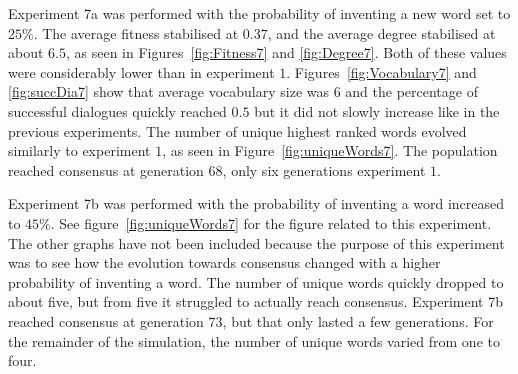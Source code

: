 Experiment 7a was performed with the probability of inventing a new word set to $25\%$. The average fitness stabilised at $0.37$, and the average degree stabilised at about $6.5$, as seen in Figures~\ref{fig:Fitness7} and \ref{fig:Degree7}. Both of these values were considerably lower than in experiment $1$. Figures~\ref{fig:Vocabulary7} and \ref{fig:succDia7} show that average vocabulary size was $6$ and the percentage of successful dialogues quickly reached $0.5$ but it did not slowly increase like in the previous experiments. The number of unique highest ranked words evolved similarly to experiment $1$, as seen in Figure~\ref{fig:uniqueWords7}. The population reached consensus at generation $68$, only six generations experiment $1$. 

Experiment 7b was performed with the probability of inventing a word increased to $45\%$. See figure~\ref{fig:uniqueWords7} for the figure related to this experiment. The other graphs have not been included because the purpose of this experiment was to see how the evolution towards consensus changed with a higher probability of inventing a word. The number of unique words quickly dropped to about five, but from five it struggled to actually reach consensus. Experiment 7b reached consensus at generation $73$, but that only lasted a few generations. For the remainder of the simulation, the number of unique words varied from one to four. 

